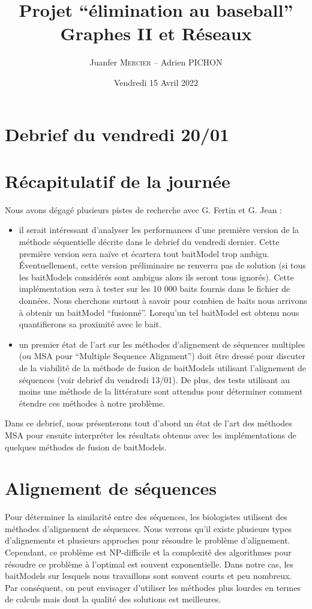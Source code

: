 \documentclass[a4paper,12pt]{article}
\title{\Huge{Projet ``élimination au baseball''}\\
\LARGE{Graphes II et Réseaux}}
\author{\large{Juanfer \textsc{Mercier} -- Adrien \textsc{PICHON}}}
\date{Vendredi 15 Avril 2022}
\begin{document}
\section*{Debrief du vendredi 20/01}

\section{Récapitulatif de la journée}
Nous avons dégagé plusieurs pistes de recherche avec G. Fertin et G. Jean :
\begin{itemize}
    \item[\textbullet] il serait intéressant d'analyser les performances d'une
        première version de la méthode séquentielle décrite dans le debrief du
        vendredi dernier. Cette première version sera naïve et écartera tout
        baitModel trop ambigu. Éventuellement, cette version préliminaire ne
        renverra pas de solution (si tous les baitModels considérés sont
        ambigus alors ils seront tous ignorés). Cette implémentation sera
        à tester sur les 10 000 baits fournis dans le fichier de données.
        Nous cherchons surtout à savoir pour combien de baits nous arrivons
        à obtenir un baitModel ``fusionné''. Lorsqu'un tel baitModel est
        obtenu nous quantifierons sa proximité avec le bait.
    \item un premier état de l'art sur les méthodes d'alignement de séquences
        multiples (ou MSA pour ``Multiple Sequence Alignment'') doit être
        dressé pour discuter de la viabilité de la méthode de fusion de
        baitModels utilisant l'alignement de séquences (voir debrief du
        vendredi 13/01). De plus, des tests utilisant au moins une méthode
        de la littérature sont attendus pour déterminer comment étendre ces
        méthodes à notre problème. \\
\end{itemize}

Dans ce debrief, nous présenterons tout d'abord un état de l'art des méthodes MSA
pour ensuite interpréter les résultats obtenus avec les implémentations de
quelques méthodes de fusion de baitModels.

\section{Alignement de séquences}
Pour déterminer la similarité entre des séquences, les biologistes utilisent
des méthodes d'alignement de séquences. Nous verrons qu'il existe plusieurs
types d'alignements et plusieurs approches pour résoudre le problème
d'alignement. Cependant, ce problème est NP-difficile et la complexité des
algorithmes pour résoudre ce problème à l'optimal est souvent exponentielle.
Dans notre cas, les baitModels sur lesquels nous travaillons sont souvent
courts et peu nombreux. Par conséquent, on peut envisager d'utiliser les
méthodes plus lourdes en termes de calculs mais dont la qualité des solutions
est meilleures.
\end{document}
